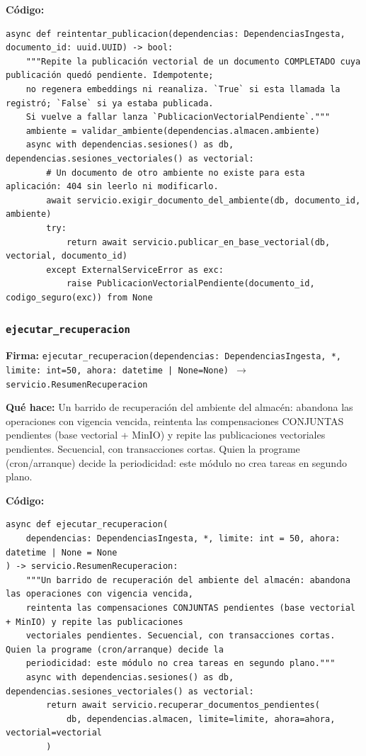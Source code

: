 \documentclass[11pt,a4paper]{article}
\begin{document}
\textbf{Código:}
\begin{lstlisting}
async def reintentar_publicacion(dependencias: DependenciasIngesta, documento_id: uuid.UUID) -> bool:
    """Repite la publicación vectorial de un documento COMPLETADO cuya publicación quedó pendiente. Idempotente;
    no regenera embeddings ni reanaliza. `True` si esta llamada la registró; `False` si ya estaba publicada.
    Si vuelve a fallar lanza `PublicacionVectorialPendiente`."""
    ambiente = validar_ambiente(dependencias.almacen.ambiente)
    async with dependencias.sesiones() as db, dependencias.sesiones_vectoriales() as vectorial:
        # Un documento de otro ambiente no existe para esta aplicación: 404 sin leerlo ni modificarlo.
        await servicio.exigir_documento_del_ambiente(db, documento_id, ambiente)
        try:
            return await servicio.publicar_en_base_vectorial(db, vectorial, documento_id)
        except ExternalServiceError as exc:
            raise PublicacionVectorialPendiente(documento_id, codigo_seguro(exc)) from None
\end{lstlisting}

\subsubsection*{\texttt{ejecutar\_recuperacion}}
\textbf{Firma:} \texttt{ejecutar\_recuperacion(dependencias: DependenciasIngesta, *, limite: int=50, ahora: datetime | None=None) $\rightarrow$ servicio.ResumenRecuperacion}

\textbf{Qué hace:} Un barrido de recuperación del ambiente del almacén: abandona las operaciones con vigencia vencida,
reintenta las compensaciones CONJUNTAS pendientes (base vectorial + MinIO) y repite las publicaciones
vectoriales pendientes. Secuencial, con transacciones cortas. Quien la programe (cron/arranque) decide la
periodicidad: este módulo no crea tareas en segundo plano.

\textbf{Código:}
\begin{lstlisting}
async def ejecutar_recuperacion(
    dependencias: DependenciasIngesta, *, limite: int = 50, ahora: datetime | None = None
) -> servicio.ResumenRecuperacion:
    """Un barrido de recuperación del ambiente del almacén: abandona las operaciones con vigencia vencida,
    reintenta las compensaciones CONJUNTAS pendientes (base vectorial + MinIO) y repite las publicaciones
    vectoriales pendientes. Secuencial, con transacciones cortas. Quien la programe (cron/arranque) decide la
    periodicidad: este módulo no crea tareas en segundo plano."""
    async with dependencias.sesiones() as db, dependencias.sesiones_vectoriales() as vectorial:
        return await servicio.recuperar_documentos_pendientes(
            db, dependencias.almacen, limite=limite, ahora=ahora, vectorial=vectorial
        )
\end{lstlisting}
\end{document}
